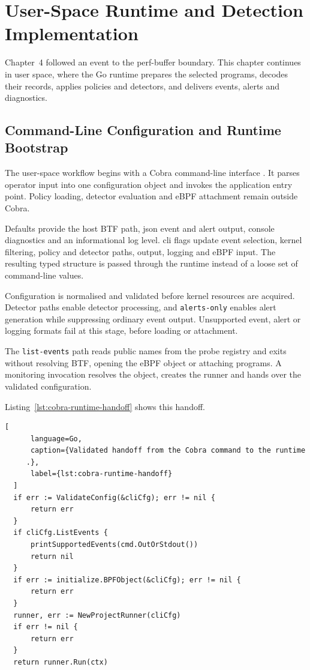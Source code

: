 \chapter{User-Space Runtime and Detection Implementation}
\label{ch:user-space-implementation}

Chapter~4 followed an event to the perf-buffer boundary. This chapter continues
in user space, where the Go runtime prepares the selected programs, decodes
their records, applies policies and detectors, and delivers events, alerts and
diagnostics.

\section{Command-Line Configuration and Runtime Bootstrap}

The user-space workflow begins with a Cobra command-line interface
\cite{spf13_cobra}. It parses operator input into one configuration object and
invokes the application entry point. Policy loading, detector evaluation and
eBPF attachment remain outside Cobra.

Defaults provide the host BTF path, \gls{json} event and alert output, console
diagnostics and an informational log level. \gls{cli} flags update event selection,
kernel filtering, policy and detector paths, output, logging and eBPF input.
The resulting typed structure is passed through the runtime instead of a loose
set of command-line values.

Configuration is normalised and validated before kernel resources are acquired.
Detector paths enable detector processing, and \texttt{alerts-only} enables
alert generation while suppressing ordinary event output. Unsupported event,
alert or logging formats fail at this stage, before loading or attachment.

The \texttt{list-events} path reads public names from the probe registry and
exits without resolving BTF, opening the eBPF object or attaching programs. A
monitoring invocation resolves the object, creates the runner and hands over
the validated configuration.

Listing~\ref{lst:cobra-runtime-handoff} shows this handoff.

  \begin{lstlisting}[
      language=Go,
      caption={Validated handoff from the Cobra command to the runtime
     .},
      label={lst:cobra-runtime-handoff}
  ]
  if err := ValidateConfig(&cliCfg); err != nil {
      return err
  }
  if cliCfg.ListEvents {
      printSupportedEvents(cmd.OutOrStdout())
      return nil
  }
  if err := initialize.BPFObject(&cliCfg); err != nil {
      return err
  }
  runner, err := NewProjectRunner(cliCfg)
  if err != nil {
      return err
  }
  return runner.Run(ctx)
  \end{lstlisting}

